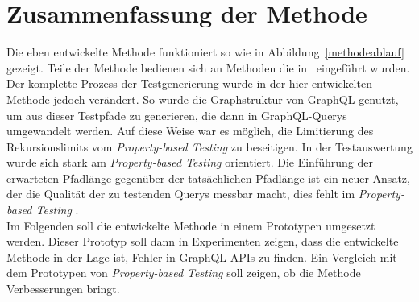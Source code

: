 \section{Zusammenfassung der Methode}

Die eben entwickelte Methode funktioniert so wie in Abbildung~\ref{methodeablauf} gezeigt.
Teile der Methode bedienen sich an Methoden die in~\cite{property-based-testing} eingeführt wurden.
Der komplette Prozess der Testgenerierung wurde in der hier entwickelten Methode jedoch verändert.
So wurde die Graphstruktur von GraphQL genutzt, um aus dieser Testpfade zu generieren, die dann in GraphQL-Querys umgewandelt werden.
Auf diese Weise war es möglich, die Limitierung des Rekursionslimits vom \textit{Property-based Testing} zu beseitigen.
In der Testauswertung wurde sich stark am \textit{Property-based Testing} orientiert.
Die Einführung der erwarteten Pfadlänge gegenüber der tatsächlichen Pfadlänge ist ein neuer Ansatz, der die Qualität der zu testenden Querys
messbar macht, dies fehlt im \textit{Property-based Testing} .
\\


Im Folgenden soll die entwickelte Methode in einem Prototypen umgesetzt werden.
Dieser Prototyp soll dann in Experimenten zeigen, dass die entwickelte Methode in der Lage ist, Fehler in GraphQL-APIs zu finden.
Ein Vergleich mit dem Prototypen von \textit{Property-based Testing} soll zeigen, ob die Methode Verbesserungen bringt.







